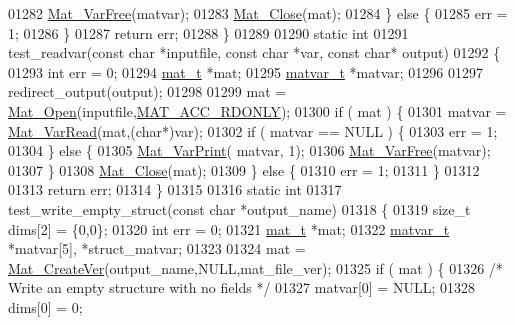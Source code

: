 \begin{DoxyCode}
{{{{01282         \hyperlink{group___m_a_t_ga1d14716f7450530fd1c9d02413787f0e}{Mat\_VarFree}(matvar);
01283         \hyperlink{group___m_a_t_ga101c92ff7bde4a2d4615661beba09262}{Mat\_Close}(mat);
01284     \} \textcolor{keywordflow}{else} \{
01285         err = 1;
01286     \}
01287     \textcolor{keywordflow}{return} err;
01288 \}
01289 
01290 \textcolor{keyword}{static} \textcolor{keywordtype}{int}
01291 test\_readvar(\textcolor{keyword}{const} \textcolor{keywordtype}{char} *inputfile, \textcolor{keyword}{const} \textcolor{keywordtype}{char} *var, \textcolor{keyword}{const} \textcolor{keywordtype}{char}* output)
01292 \{
01293     \textcolor{keywordtype}{int} err = 0;
01294     \hyperlink{struct__mat__t}{mat\_t} *mat;
01295     \hyperlink{group___m_a_t_structmatvar__t}{matvar\_t} *matvar;
01296 
01297     redirect\_output(output);
01298 
01299     mat = \hyperlink{group___m_a_t_gafbfedb5636a99f0ef867520c47f77d18}{Mat\_Open}(inputfile,\hyperlink{group___m_a_t_ggaa9dcbc70f538af79bd557593ff6b5cdba8dd1457651b27ba9bea6cfba158c037c}{MAT\_ACC\_RDONLY});
01300     \textcolor{keywordflow}{if} ( mat ) \{
01301         matvar = \hyperlink{group___m_a_t_ga3505f63029763eaa73d5a19f1115eb42}{Mat\_VarRead}(mat,(\textcolor{keywordtype}{char}*)var);
01302         \textcolor{keywordflow}{if} ( matvar == NULL ) \{
01303             err = 1;
01304         \} \textcolor{keywordflow}{else} \{
01305             \hyperlink{group___m_a_t_ga9100c145e338b84b55d5d0795d5d390a}{Mat\_VarPrint}( matvar, 1);
01306             \hyperlink{group___m_a_t_ga1d14716f7450530fd1c9d02413787f0e}{Mat\_VarFree}(matvar);
01307         \}
01308         \hyperlink{group___m_a_t_ga101c92ff7bde4a2d4615661beba09262}{Mat\_Close}(mat);
01309     \} \textcolor{keywordflow}{else} \{
01310         err = 1;
01311     \}
01312 
01313     \textcolor{keywordflow}{return} err;
01314 \}
01315 
01316 \textcolor{keyword}{static} \textcolor{keywordtype}{int}
01317 test\_write\_empty\_struct(\textcolor{keyword}{const} \textcolor{keywordtype}{char} *output\_name)
01318 \{
01319     \textcolor{keywordtype}{size\_t}  dims[2] = \{0,0\};
01320     \textcolor{keywordtype}{int}    err = 0;
01321     \hyperlink{struct__mat__t}{mat\_t}     *mat;
01322     \hyperlink{group___m_a_t_structmatvar__t}{matvar\_t} *matvar[5], *struct\_matvar;
01323 
01324     mat = \hyperlink{group___m_a_t_ga22d404f203af7869c841400e7ad247cf}{Mat\_CreateVer}(output\_name,NULL,mat\_file\_ver);
01325     \textcolor{keywordflow}{if} ( mat ) \{
01326         \textcolor{comment}{/* Write an empty structure with no fields */}
01327         matvar[0] = NULL;
01328         dims[0] = 0;
}}}}
\end{DoxyCode}
